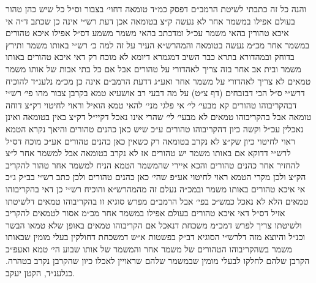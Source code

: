 \documentclass[12pt, openany]{book}
\begin{document}
\begin{multicols}{2}
והנה כל זה כתבתי לשיטת הרמב״ם דפסק כמ״ד טומאה דחוי׳ בצבור וס״ל כל שיש כהן טהור בעולם אפילו במשמר אחר לא נעשה ק״צ בטומאה אכן דעת רש״י אינה כן שכתב ד״ה אי איכא טהורין בהאי משמר עכ״ל ומדכתב בהאי משמר משמע דס״ל אפילו איכא טהורים במשמר אחר מכ״מ נעשה בטומאה והמהרש״א העיר על זה למה כ׳ רש״י באותו משמר ותירץ בדוחק ובמהדורא בתרא כבר השיב דמגמרא דיומא לא מוכח רק דאי איכא טהורים באותו משמר ובית אב אחר בזה צריך לאהדורי על טהורים אבל אם כל בתי אבות של אותו משמר טמאים לא צריך לאהדורי על משמר אחר ואע״ג דדעת הרמב״ם אינה כן מכ״מ נלענ״ד להוכיח דרש״י ס״ל הכי דבזבחים (דף צ״ט) על מה דבעי רב אושעיא טמא בקרבן צבור מהו פי׳ רש״י דבהקריבוהו טהורים קא מבעי׳ לי׳ אי פלגי מני׳ להאי טמא הואיל וראוי לחיטוי דק״צ דוחה טומאה אבל בהקריבוהו טמאים לא מבעי׳ לי׳ שהרי אינו נאכל דקיי״ל דק״צ באין בטומאה ואינן נאכלין עכ״ל וקשה כיון דהקריבוהו טהורים ע״כ שיש כאן כהנים טהורים והיאך נקרא הטמא ראוי לחיטוי כיון שק״צ לא נקרב בטומאה רק כשאין כאן כהנים טהורים אע״כ מוכח דס״ל לרש״י דדוקא אם באותו משמר יש טהורים אז לא נקרב בטומאה אבל למשמר אחר ל״צ להחזיר אחר כהנים טהורים והכא איירי שהמשמר הטמא הניח למשמר אחר טהור להקריב הק״צ ולכן מקרי הטמא ראוי לחיטוי אע״פ שהי׳ כאן כהנים טהורים ולכן כתב רש״י בב״ק ג״כ אי איכא טהורים באותו משמר ובמכ״ה נעלם זה מהמהרש״א והוכיח רש״י כן דאי בהקריבוהו טמאים הלא לא נאכל כמש״כ בפי׳ אבל הרמב״ם מפרש סוגיא זו בהקריבוהו טמאים דלשיטתו אזיל דס״ל דאי איכא טהורים בעולם אפילו במשמר אחר מכ״מ אסור לטמאים להקריב ולשיטתו צריך לפרש דמכ״מ משכחת דנאכל אם הקריבוהו טמאים באופן שלא טמאו הבשר וכנ״ל והיוצא מזה דלרש״י הסוגיא דב״ק בפשטות א״ש דמשכחת דחולקין בעלי מומין שבאותו משמר בשהקריבוהו הטהורים של משמר אחר והמשמר של אותו שבוע הי׳ טמא ואעפ״כ הקרבן שלהם לחלקו לבעלי מומין שבמשמר שלהם שראויין לאכלו כיון שהקרבן נקרב בטהרה. כנלענ״ד, הקטן יעקב.\\\vspace{0pt}

\end{multicols}\newpage
\end{document}
